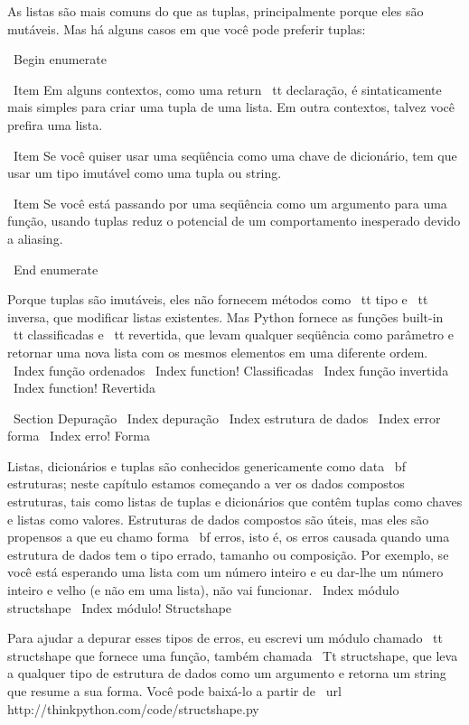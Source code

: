 \documentclass[10pt]{book}
\begin{document}
{{{{{{{{{As listas são mais comuns do que as tuplas, principalmente porque eles são mutáveis.
Mas há alguns casos em que você pode preferir tuplas:

\ Begin {enumerate}

\ Item Em alguns contextos, como uma {return \ tt} declaração, é
sintaticamente mais simples para criar uma tupla de uma lista. Em outra
contextos, talvez você prefira uma lista.

\ Item Se você quiser usar uma seqüência como uma chave de dicionário,
tem que usar um tipo imutável como uma tupla ou string.

\ Item Se você está passando por uma seqüência como um argumento para uma função,
usando tuplas reduz o potencial de um comportamento inesperado
devido a aliasing.

\ End {enumerate}

Porque tuplas são imutáveis, eles não fornecem métodos
como {\ tt tipo} e {\ tt inversa}, que modificar listas existentes.
Mas Python fornece as funções built-in {\ tt classificadas}
e {\ tt revertida}, que levam qualquer seqüência como parâmetro
e retornar uma nova lista com os mesmos elementos em uma diferente
ordem.
\ Index {função ordenados}
\ Index {function! Classificadas}
\ Index {função invertida}
\ Index {function! Revertida}


\ Section {} Depuração
\ Index {depuração}
\ Index {estrutura de dados}
\ Index {error forma}
\ Index {erro! Forma}

Listas, dicionários e tuplas são conhecidos genericamente como {data \ bf
  estruturas}; neste capítulo estamos começando a ver os dados compostos
estruturas, tais como listas de tuplas e dicionários que contêm tuplas
como chaves e listas como valores. Estruturas de dados compostos são úteis, mas
eles são propensos a que eu chamo {forma \ bf erros}, isto é, os erros
causada quando uma estrutura de dados tem o tipo errado, tamanho ou composição.
Por exemplo, se você está esperando uma lista com um número inteiro e eu
dar-lhe um número inteiro e velho (e não em uma lista), não vai funcionar.
\ Index {módulo structshape}
\ Index {módulo! Structshape}


Para ajudar a depurar esses tipos de erros, eu escrevi um módulo
chamado {\ tt structshape} que fornece uma função, também chamada
{\ Tt structshape}, que leva a qualquer tipo de estrutura de dados como
um argumento e retorna um string que resume a sua forma.
Você pode baixá-lo a partir de \ url {http://thinkpython.com/code/structshape.py}

}}}}}}}}}
\end{document}
